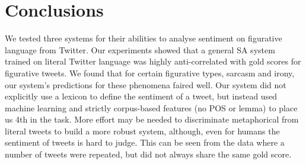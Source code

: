 \documentclass[11pt,letterpaper]{article}
\begin{document}
%
%






\section{Conclusions}
We tested three systems for their abilities to analyse sentiment on figurative language from Twitter. Our experiments showed that a general SA system trained on literal Twitter language was highly anti-correlated with gold scores for figurative tweets. We found that for certain figurative types, sarcasm and irony, our system's predictions for these phenomena faired well. Our system did not explicitly use a lexicon to define the sentiment of a tweet, but instead used machine learning and strictly corpus-based features (no POS or lemma) to place us 4th in the task. %
More effort may be needed to discriminate  metaphorical from literal tweets to build a more robust system, although, even for humans the sentiment of tweets is hard to judge. This can be seen from the data where a number of tweets were repeated, but did not always share the same gold score.







\end{document}
